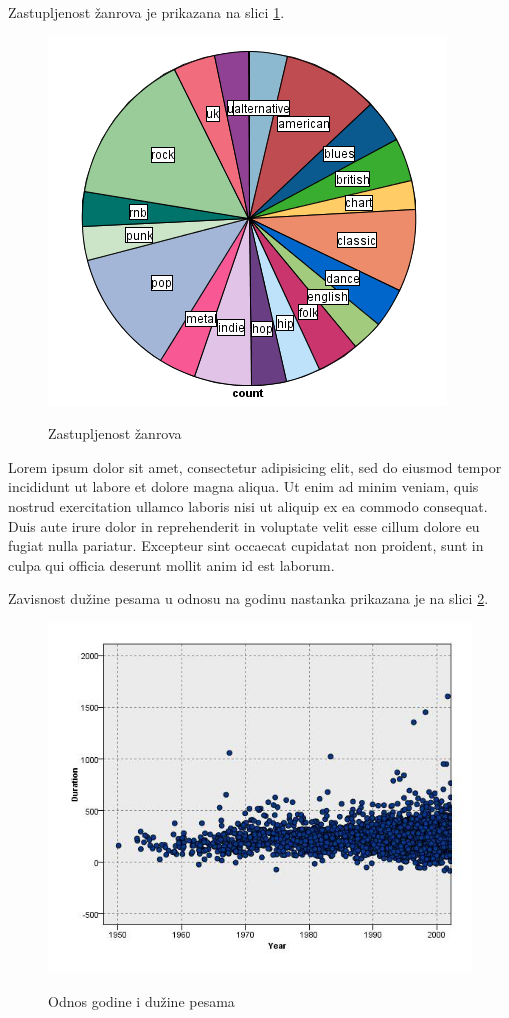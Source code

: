 Zastupljenost \v{z}anrova je prikazana na slici \ref{fig:ZastupljenostZanrova}.
\begin{figure}[H]
    \centering
    \includegraphics[scale=0.55]{resources/ZastupljenostZanrova.png}
    \label{fig:ZastupljenostZanrova}
    \caption{Zastupljenost \v{z}anrova}
\end{figure}

Lorem ipsum dolor sit amet, consectetur adipisicing elit, sed do eiusmod tempor incididunt ut labore et dolore magna aliqua. Ut enim ad minim veniam, quis nostrud exercitation ullamco laboris nisi ut aliquip ex ea commodo consequat. Duis aute irure dolor in reprehenderit in voluptate velit esse cillum dolore eu fugiat nulla pariatur. Excepteur sint occaecat cupidatat non proident, sunt in culpa qui officia deserunt mollit anim id est laborum.

Zavisnost du\v{z}ine pesama u odnosu na godinu nastanka prikazana je na slici \ref{fig:YearDuration}.
\begin{figure}[H]
    \centering
    \includegraphics[scale=0.4]{resources/year-duration.jpg}
    \label{fig:YearDuration}
    \caption{Odnos godine i du\v{z}ine pesama}
\end{figure}

